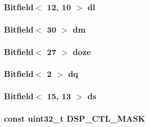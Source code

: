 \label{namespaceMipsISA_aed47aeefc09617cb8eb43344b41b29ba}
\hypertarget{namespaceMipsISA_a095203e359cdded376c6b9ecf71960eb}{
\subsubsection[{dl}]{\setlength{\rightskip}{0pt plus 5cm}Bitfield$<$ 12, 10 $>$ {\bf dl}}}
\label{namespaceMipsISA_a095203e359cdded376c6b9ecf71960eb}
\hypertarget{namespaceMipsISA_a2575c29e7f4617b6076486f340b6fe19}{
\subsubsection[{dm}]{\setlength{\rightskip}{0pt plus 5cm}Bitfield$<$ 30 $>$ {\bf dm}}}
\label{namespaceMipsISA_a2575c29e7f4617b6076486f340b6fe19}
\hypertarget{namespaceMipsISA_a25c92b67b9c868951dcc1346e05217ec}{
\subsubsection[{doze}]{\setlength{\rightskip}{0pt plus 5cm}Bitfield$<$ 27 $>$ {\bf doze}}}
\label{namespaceMipsISA_a25c92b67b9c868951dcc1346e05217ec}
\hypertarget{namespaceMipsISA_ac68f02a27ac5b77c4c280489f991c32b}{
\subsubsection[{dq}]{\setlength{\rightskip}{0pt plus 5cm}Bitfield$<$ 2 $>$ {\bf dq}}}
\label{namespaceMipsISA_ac68f02a27ac5b77c4c280489f991c32b}
\hypertarget{namespaceMipsISA_af99c5bc05a6ca7d714ff7db9402c9cca}{
\subsubsection[{ds}]{\setlength{\rightskip}{0pt plus 5cm}Bitfield$<$ 15, 13 $>$ {\bf ds}}}
\label{namespaceMipsISA_af99c5bc05a6ca7d714ff7db9402c9cca}
\hypertarget{namespaceMipsISA_a5bb9a799de2f7a0b358e24ef4255787b}{
\subsubsection[{DSP\_\-CTL\_\-MASK}]{\setlength{\rightskip}{0pt plus 5cm}const {\bf uint32\_\-t} {\bf DSP\_\-CTL\_\-MASK}}}
